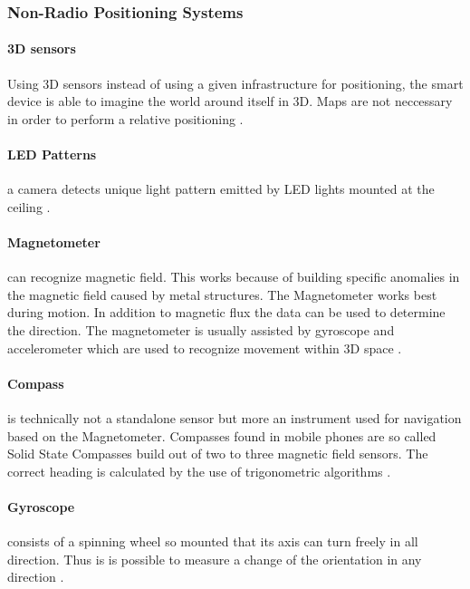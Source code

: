\subsubsection{Non-Radio Positioning Systems}

\paragraph{3D sensors} Using 3D sensors instead of using a given infrastructure for positioning, the smart device is able to imagine the world around itself in 3D. Maps are not neccessary in order to perform a relative positioning \parencite{projectTango}.

\paragraph{LED Patterns} a camera detects unique light pattern emitted by LED lights mounted at the ceiling \parencite{bytelight}. 

\paragraph{Magnetometer} can recognize magnetic field. This works because of building specific anomalies in the magnetic field caused by metal structures. The Magnetometer works best during motion. In addition to magnetic flux the data can be used to determine the direction. The magnetometer is usually assisted by gyroscope and accelerometer which are used to recognize movement within 3D space \parencite{magnetometer}.

\paragraph{Compass} is technically not a standalone sensor but more an instrument used for navigation based on the Magnetometer. Compasses found in mobile phones are so called Solid State Compasses build out of two to three magnetic field sensors. The correct heading is calculated by the use of trigonometric algorithms \parencite{magnetometer}.

\paragraph{Gyroscope} consists of a spinning wheel so mounted that its axis can turn freely in all direction. Thus is is possible to measure a change of the orientation in any direction \parencite{gyroscope}. 

